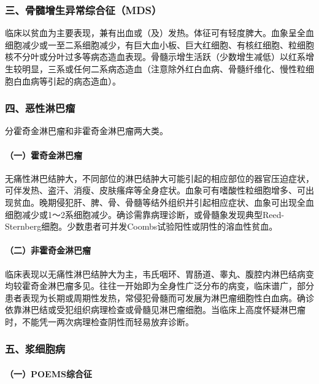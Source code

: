 \subsubsection{三、骨髓增生异常综合征（MDS）}

临床以贫血为主要表现，兼有出血或（及）发热。体征可有轻度脾大。血象呈全血细胞减少或一至二系细胞减少，有巨大血小板、巨大红细胞、有核红细胞、粒细胞核不分叶或分叶过多等病态造血表现。骨髓示增生活跃（少数增生减低）以红系增生较明显，三系或任何二系病态造血（注意除外红白血病、骨髓纤维化、慢性粒细胞白血病等引起的病态造血）。

\subsubsection{四、恶性淋巴瘤}

分霍奇金淋巴瘤和非霍奇金淋巴瘤两大类。

\paragraph{（一）霍奇金淋巴瘤}

无痛性淋巴结肿大，不同部位的淋巴结肿大可能引起的相应部位的器官压迫症状，可伴发热、盗汗、消瘦、皮肤瘙痒等全身症状。血象可有嗜酸性粒细胞增多、可出现贫血。晚期侵犯肝、脾、骨、骨髓等结外组织并引起相应症状、血象可出现全血细胞减少或1～2系细胞减少。确诊需靠病理诊断，或骨髓象发现典型Reed-Sternberg细胞。少数患者可并发Coombs试验阳性或阴性的溶血性贫血。

\paragraph{（二）非霍奇金淋巴瘤}

临床表现以无痛性淋巴结肿大为主，韦氏咽环、胃肠道、睾丸、腹腔内淋巴结病变均较霍奇金淋巴瘤多见。往往一开始即为全身性广泛分布的病变，临床谱广，部分患者表现为长期或周期性发热，常侵犯骨髓而可发展为淋巴瘤细胞性白血病。确诊依靠淋巴结或受犯组织病理检查或骨髓见淋巴瘤细胞。当临床上高度怀疑淋巴瘤时，不能凭一两次病理检查阴性而轻易放弃诊断。

\subsubsection{五、浆细胞病}

\paragraph{（一）POEMS综合征}

